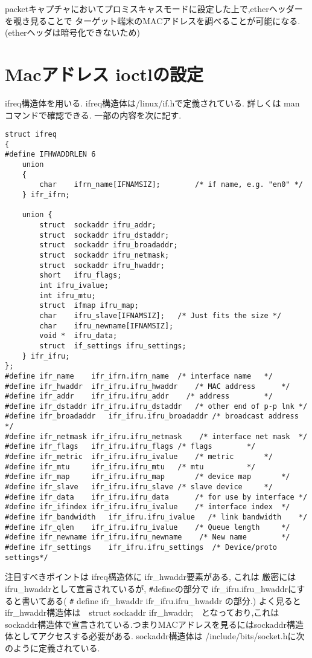 \documentclass[a4paper]{article}%
\begin{document}
packetキャプチャにおいてプロミスキャスモードに設定した上で,etherヘッダーを覗き見ることで ターゲット端末のMACアドレスを調べることが可能になる.(etherヘッダは暗号化できないため)



\section{Macアドレス ioctlの設定}
ifreq構造体を用いる. ifreq構造体は/linux/if.hで定義されている. 詳しくは man コマンドで確認できる.
一部の内容を次に記す.
\begin{lstlisting}[caption=ifreq, label=ifreq]
struct ifreq 
{
#define IFHWADDRLEN	6
	union
	{
		char	ifrn_name[IFNAMSIZ];		/* if name, e.g. "en0" */
	} ifr_ifrn;
	
	union {
		struct	sockaddr ifru_addr;
		struct	sockaddr ifru_dstaddr;
		struct	sockaddr ifru_broadaddr;
		struct	sockaddr ifru_netmask;
		struct  sockaddr ifru_hwaddr;
		short	ifru_flags;
		int	ifru_ivalue;
		int	ifru_mtu;
		struct  ifmap ifru_map;
		char	ifru_slave[IFNAMSIZ];	/* Just fits the size */
		char	ifru_newname[IFNAMSIZ];
		void *	ifru_data;
		struct	if_settings ifru_settings;
	} ifr_ifru;
};
#define ifr_name	ifr_ifrn.ifrn_name	/* interface name 	*/
#define ifr_hwaddr	ifr_ifru.ifru_hwaddr	/* MAC address 		*/
#define	ifr_addr	ifr_ifru.ifru_addr	  /* address		*/
#define	ifr_dstaddr	ifr_ifru.ifru_dstaddr	/* other end of p-p lnk	*/
#define	ifr_broadaddr	ifr_ifru.ifru_broadaddr	/* broadcast address	*/
#define	ifr_netmask	ifr_ifru.ifru_netmask	 /* interface net mask	*/
#define	ifr_flags	ifr_ifru.ifru_flags	/* flags		*/
#define	ifr_metric	ifr_ifru.ifru_ivalue	/* metric		*/
#define	ifr_mtu		ifr_ifru.ifru_mtu	/* mtu			*/
#define ifr_map		ifr_ifru.ifru_map   	/* device map		*/
#define ifr_slave	ifr_ifru.ifru_slave	/* slave device		*/
#define	ifr_data	ifr_ifru.ifru_data	 	/* for use by interface	*/
#define ifr_ifindex	ifr_ifru.ifru_ivalue	/* interface index	*/
#define ifr_bandwidth	ifr_ifru.ifru_ivalue   /* link bandwidth	*/
#define ifr_qlen	ifr_ifru.ifru_ivalue	/* Queue length 	*/
#define ifr_newname	ifr_ifru.ifru_newname	 /* New name		*/
#define ifr_settings	ifr_ifru.ifru_settings	/* Device/proto settings*/

\end{lstlisting}

注目すべきポイントは ifreq構造体に ifr\_hwaddr要素がある, これは 厳密にはifru\_hwaddrとして宣言されているが,
\verb|#|defineの部分で  ifr\_ifru.ifru\_hwaddrにすると書いてある( \verb|#| define ifr\_hwaddr	ifr\_ifru.ifru\_hwaddr の部分.)
よく見ると ifr\_hwaddr構造体は　struct  sockaddr ifr\_hwaddr;　となっており,これはsockaddr構造体で宣言されている.つまりMACアドレスを見るにはsockaddr構造体としてアクセスする必要がある.
sockaddr構造体は /include/bits/socket.hに次のように定義されている.
\end{document}
